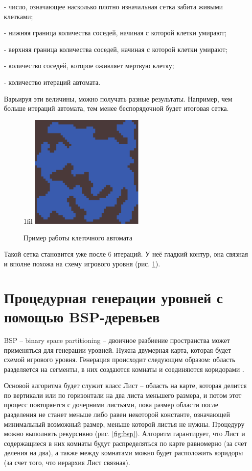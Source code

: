 \documentclass[a4paper,12pt]{report}
\makeatletter
\newcommand*{\centerfloat}{%
  \parindent \z@
  \leftskip \z@ \@plus 1fil \@minus \textwidth
  \rightskip\leftskip
  \parfillskip \z@skip}
\makeatother
\begin{document}
- число, означающее насколько плотно изначальная сетка забита живыми клетками;

- нижняя граница количества соседей, начиная с которой клетки умирают;

- верхняя граница количества соседей, начиная с которой клетки умирают;

- количество соседей, которое оживляет мертвую клетку;

- количество итераций автомата.

Варьируя эти величины, можно получать разные результаты. Например, чем больше итераций автомата, тем менее беспорядочной будет итоговая сетка.

\begin{figure}
    \centerfloat
    \includegraphics[width=0.5\textwidth]{levels/1.png}
    \caption{Пример работы клеточного автомата \citep{cellar}}
    \label{fig:cellular}
\end{figure}

Такой сетка становится уже после 6 итераций. У неё гладкий контур, она связная и вполне похожа на схему игрового уровня (рис. \ref{fig:cellular}).

\section{Процедурная генерации уровней с помощью BSP-деревьев}

BSP – binary space partitioning – двоичное разбиение пространства может применяться для генерации уровней. Нужна двумерная карта, которая будет схемой игрового уровня. Генерация происходит следующим образом: область разделяется на сегменты, в них создаются комнаты и соединяются коридорами \citep{bsp}.

Основой алгоритма будет служит класс Лист – область на карте, которая делится по вертикали или по горизонтали на два листа меньшего размера, и потом этот процесс повторяется с дочерними листьями, пока размер области после разделения не станет меньше либо равен некоторой константе, означающей минимальный возможный размер, меньше которой листья не нужны. Процедуру можно выполнять рекурсивно (рис. \ref{fig:bsp}). Алгоритм гарантирует, что Лист и содержащиеся в них комнаты будут распределяться по карте равномерно (за счет деления на два), а также между комнатами можно будет расположить коридоры (за счет того, что иерархия Лист связная).
\end{document}
